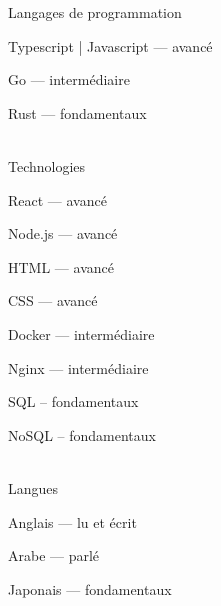 

\begin{cvskills}

  \cvskill
    {Langages de programmation} %
    {
      \begin{cvitems} %
        \item {Typescript | Javascript — avancé}
        \item {Go — intermédiaire}
        \item {Rust — fondamentaux}
      \end{cvitems}
    }
\\

  \cvskill
    {Technologies} %
    {
      \begin{cvitems} %
        \item {React — avancé}
        \item {Node.js — avancé}
        \item {HTML — avancé}
        \item {CSS — avancé}
        \item {Docker — intermédiaire}
        \item {Nginx — intermédiaire}
        \item {SQL – fondamentaux}
        \item {NoSQL – fondamentaux}
      \end{cvitems}
    }
\\

  \cvskill
    {Langues} %
    {
      \begin{cvitems} %
        \item {Anglais — lu et écrit}
        \item {Arabe — parlé}
        \item {Japonais — fondamentaux}
      \end{cvitems}
    }

\end{cvskills}
